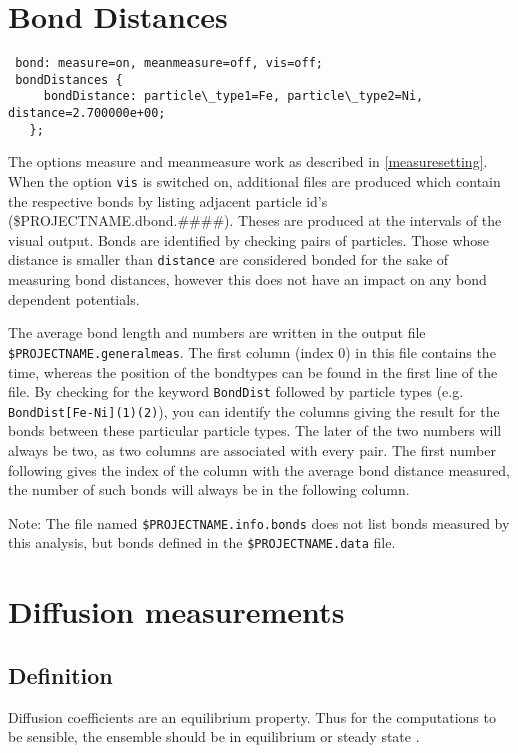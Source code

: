 \section{Bond Distances}
\begin{lstlisting}
 bond: measure=on, meanmeasure=off, vis=off;
 bondDistances {
     bondDistance: particle\_type1=Fe, particle\_type2=Ni, distance=2.700000e+00;
   };
\end{lstlisting}

The options measure and meanmeasure work as described in \ref{measuresetting}. When the option {\tt vis} is switched on, additional files are produced which contain the respective bonds 
by listing adjacent particle id's (\$PROJECTNAME.dbond.\#\#\#\#). Theses are produced at the intervals of the visual output.
Bonds are identified by checking pairs of particles. Those whose distance is smaller than {\tt distance} are considered bonded for the sake of measuring bond distances, 
however this does not have an impact on any bond dependent potentials.

The average bond length and numbers are written in the output file {\tt \$PROJECTNAME.generalmeas}.
The first column (index 0) in this file contains the time, whereas the position of the bondtypes can be found in the first line of the file. By checking for the keyword {\tt BondDist} followed by particle types
(e.g. {\tt BondDist[Fe-Ni](1)(2)}), you can identify the columns giving the result for the bonds between these particular particle types. The later of the two numbers will always be two, as two columns are associated with every pair.
The first number following gives the index of the column with the average bond distance measured, the number of such bonds will always be in the following column.

Note: The file named {\tt \$PROJECTNAME.info.bonds} does not list bonds measured by this analysis, but bonds defined in the {\tt \$PROJECTNAME.data} file.

\section{Diffusion measurements}

\subsection{Definition}
Diffusion coefficients are an equilibrium property. Thus for the computations to be sensible, the ensemble should be in equilibrium or steady state .

